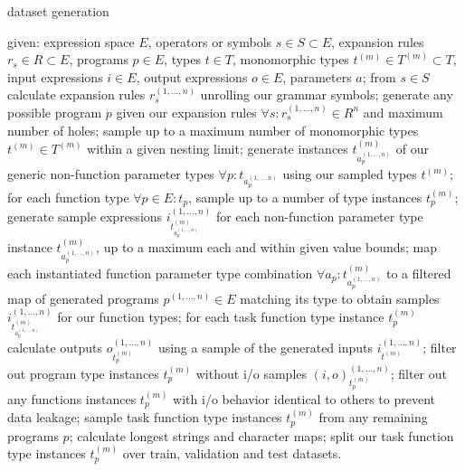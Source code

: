 \documentclass{article}
\begin{document}
\begin{algorithm}
    \caption{dataset generation}
    \label{alg:gen}
    \begin{algorithmic}
        \State given: expression space $E$, operators or symbols $s \in S \subset E$, expansion rules $r_s \in R \subset E$, programs $p \in E$, types $t \in T$, monomorphic types $t^{(m)} \in T^{(m)} \subset T$, input expressions $i \in E$, output expressions $o \in E$, parameters $a$;
        \State from $s \in S$ calculate expansion rules $r_s^{(1, \dots, n)}$ unrolling our grammar symbols; %
        \State generate any possible program $p$ given our expansion rules $\forall s : r_s^{(1, \dots, n)} \in R^n$ and maximum number of holes;
        \State sample up to a maximum number of monomorphic types $t^{(m)} \in T^{(m)}$ within a given nesting limit;
        \State generate instances $t^{(m)}_{a_p^{(1, \dots, n)}}$ of our generic non-function parameter types $\forall p : t_{a_p^{(1, \dots, n)}}$ using our sampled types $t^{(m)}$;
        \State for each function type $\forall p \in E: t_p$, sample up to a number of type instances $t^{(m)}_p$;
        \State generate sample expressions $i_{t^{(m)}_{a_p^{(1, \dots, n)}}}^{(1, \dots, n)}$ for each non-function parameter type instance $t^{(m)}_{a_p^{(1, \dots, n)}}$, up to a maximum each and within given value bounds;
        \State map each instantiated function parameter type combination $\forall a_p : t^{(m)}_{a_p^{(1, \dots, n)}}$ to a filtered map of generated programs $p^{(1, \dots, n)} \in E$ matching its type to obtain samples $i_{t^{(m)}_{a_p^{(1, \dots, n)}}}^{(1, \dots, n)}$ for our function types;
        \State for each task function type instance $t^{(m)}_p$ calculate outputs $o_{t^{(m)}_p}^{(1, \dots, n)}$ using a sample of the generated inputs $i_{t^{(m)}}^{(1, \dots, n)}$;
        \State filter out program type instances $t^{(m)}_p$ without i/o samples $(i,o)_{t^{(m)}_p}^{(1, \dots, n)}$;
        \State filter out any functions instances $t^{(m)}_p$ with i/o behavior identical to others to prevent data leakage;
        \State sample task function type instances $t^{(m)}_p$ from any remaining programs $p$;
        \State calculate longest strings and character maps;
        \State split our task function type instances $t^{(m)}_p$ over train, validation and test datasets.
    \end{algorithmic} 
\end{algorithm}
\end{document}

